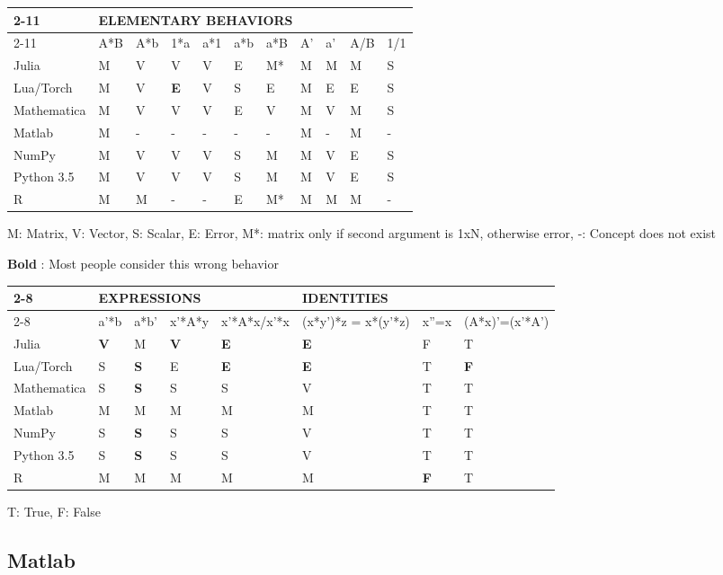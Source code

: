 \begin{table*}
\caption{Summary of semantics across programming languages}
\begin{tabular}{lllllllllll}
\cmidrule{2-11}
\multicolumn{1}{l}{} & \multicolumn{10}{l}{ELEMENTARY BEHAVIORS}\tabularnewline
\cmidrule{2-11}
\multicolumn{1}{l}{} & A{*}B  & A{*}b  & 1{*}a  & a{*}1  & a{*}b  & a{*}B  & A'  & a'  & A/B  & 1/1\tabularnewline
\midrule
Julia  & M  & V  & V  & V  & E  & M{*}  & M  & M  & M  & S\tabularnewline
\midrule
Lua/Torch  & M  & V  & \textbf{E}  & V  & S  & E  & M  & E  & E  & S\tabularnewline
\midrule
Mathematica  & M  & V  & V  & V  & E  & V  & M  & V  & M  & S\tabularnewline
\midrule
Matlab  & M  & -  & -  & -  & -  & -  & M  & -  & M  & -\tabularnewline
\midrule
NumPy  & M  & V  & V  & V  & S  & M  & M  & V  & E  & S\tabularnewline
\midrule
Python 3.5  & M  & V  & V  & V  & S  & M  & M  & V  & E  & S\tabularnewline
\midrule
R  & M  & M  & -  & -  & E  & M{*}  & M  & M  & M  & -\tabularnewline
\bottomrule
\end{tabular}

M: Matrix, V: Vector, S: Scalar, E: Error, M{*}: matrix only if second
argument is 1xN, otherwise error, -: Concept does not exist

\textbf{Bold} : Most people consider this wrong behavior

\begin{tabular}{llllllll}
\cmidrule{2-8}
\multicolumn{1}{l}{} & \multicolumn{4}{l}{EXPRESSIONS} & \multicolumn{3}{l}{IDENTITIES}\tabularnewline
\cmidrule{2-8}
\multicolumn{1}{l}{} & a'{*}b  & a{*}b'  & x'{*}A{*}y  & x'{*}A{*}x/x'{*}x  & (x{*}y'){*}z = x{*}(y'{*}z)  & x''=x  & (A{*}x)'=(x'{*}A')\tabularnewline
\midrule
Julia  & \textbf{V}  & M  & \textbf{V}  & \textbf{E}  & \textbf{E}  & F  & T\tabularnewline
\midrule
Lua/Torch  & S  & \textbf{S}  & E  & \textbf{E}  & \textbf{E}  & T  & \textbf{F}\tabularnewline
\midrule
Mathematica  & S  & \textbf{S}  & S  & S  & V  & T  & T\tabularnewline
\midrule
Matlab  & M  & M  & M  & M  & M  & T  & T\tabularnewline
\midrule
NumPy  & S  & \textbf{S}  & S  & S  & V  & T  & T\tabularnewline
\midrule
Python 3.5  & S  & \textbf{S}  & S  & S  & V  & T  & T\tabularnewline
\midrule
R  & M  & M  & M  & M  & M  & \textbf{F}  & T\tabularnewline
\bottomrule
\end{tabular}

T: True, F: False
\end{table*}


\subsection{Matlab}

